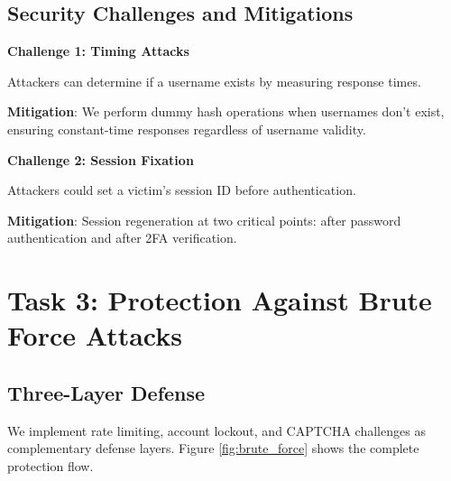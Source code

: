 \documentclass[12pt,a4paper]{article}
\begin{document}
\subsection{Security Challenges and Mitigations}

\textbf{Challenge 1: Timing Attacks}

Attackers can determine if a username exists by measuring response times.

\textbf{Mitigation}: We perform dummy hash operations when usernames don't exist, ensuring constant-time responses regardless of username validity.

\textbf{Challenge 2: Session Fixation}

Attackers could set a victim's session ID before authentication.

\textbf{Mitigation}: Session regeneration at two critical points: after password authentication and after 2FA verification.

\section{Task 3: Protection Against Brute Force Attacks}

\subsection{Three-Layer Defense}

We implement rate limiting, account lockout, and CAPTCHA challenges as complementary defense layers. Figure \ref{fig:brute_force} shows the complete protection flow.
\end{document}
